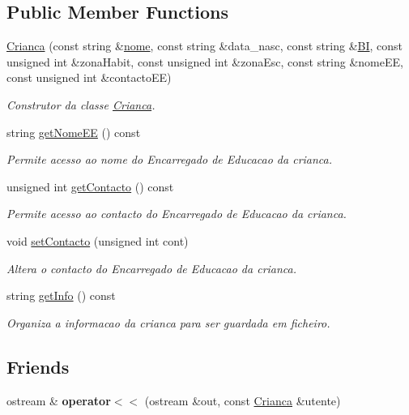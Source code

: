 \subsection*{Public Member Functions}
\begin{DoxyCompactItemize}
\item 
\mbox{\hyperlink{class_crianca_a3b66bc9f3d1302400f5fec96f380f669}{Crianca}} (const string \&\mbox{\hyperlink{class_utente_a328c722d27759eaa88596ccb4cf2549f}{nome}}, const string \&data\+\_\+nasc, const string \&\mbox{\hyperlink{class_utente_ac5acf8e42ccd10808d077fc0db2e05f9}{BI}}, const unsigned int \&zona\+Habit, const unsigned int \&zona\+Esc, const string \&nome\+EE, const unsigned int \&contacto\+EE)
\begin{DoxyCompactList}\small\item\em Construtor da classe \mbox{\hyperlink{class_crianca}{Crianca}}. \end{DoxyCompactList}\item 
string \mbox{\hyperlink{class_crianca_ab93207d112d82437a86b230e1e0a5835}{get\+Nome\+EE}} () const
\begin{DoxyCompactList}\small\item\em Permite acesso ao nome do Encarregado de Educacao da crianca. \end{DoxyCompactList}\item 
unsigned int \mbox{\hyperlink{class_crianca_a528589e1353aa4eb4348e9e1d67b6a47}{get\+Contacto}} () const
\begin{DoxyCompactList}\small\item\em Permite acesso ao contacto do Encarregado de Educacao da crianca. \end{DoxyCompactList}\item 
void \mbox{\hyperlink{class_crianca_ac5a08589414697db0269fbcf44bb96f0}{set\+Contacto}} (unsigned int cont)
\begin{DoxyCompactList}\small\item\em Altera o contacto do Encarregado de Educacao da crianca. \end{DoxyCompactList}\item 
string \mbox{\hyperlink{class_crianca_a7cd065415f6f0a2802ca2d37a3a7cc25}{get\+Info}} () const
\begin{DoxyCompactList}\small\item\em Organiza a informacao da crianca para ser guardada em ficheiro. \end{DoxyCompactList}\end{DoxyCompactItemize}
\subsection*{Friends}
\begin{DoxyCompactItemize}
\item 
\mbox{\label{class_crianca_a2a82fda6331ef8d7e44a861ec86a5a6e}} 
ostream \& {\bfseries operator$<$$<$} (ostream \&out, const \mbox{\hyperlink{class_crianca}{Crianca}} \&utente)
\end{DoxyCompactItemize}
